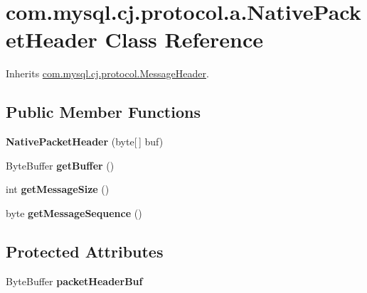 \hypertarget{classcom_1_1mysql_1_1cj_1_1protocol_1_1a_1_1_native_packet_header}{}\section{com.\+mysql.\+cj.\+protocol.\+a.\+Native\+Packet\+Header Class Reference}
\label{classcom_1_1mysql_1_1cj_1_1protocol_1_1a_1_1_native_packet_header}


Inherits \mbox{\hyperlink{interfacecom_1_1mysql_1_1cj_1_1protocol_1_1_message_header}{com.\+mysql.\+cj.\+protocol.\+Message\+Header}}.

\subsection*{Public Member Functions}
\begin{DoxyCompactItemize}
\item 
\mbox{\label{classcom_1_1mysql_1_1cj_1_1protocol_1_1a_1_1_native_packet_header_a835faea36a24b4d257415f21bfac6e1c}} 
{\bfseries Native\+Packet\+Header} (byte\mbox{[}$\,$\mbox{]} buf)
\item 
\mbox{\label{classcom_1_1mysql_1_1cj_1_1protocol_1_1a_1_1_native_packet_header_a4a2e68d77caa301eab35d33743c8a9ae}} 
Byte\+Buffer {\bfseries get\+Buffer} ()
\item 
\mbox{\label{classcom_1_1mysql_1_1cj_1_1protocol_1_1a_1_1_native_packet_header_a334336fd736a087bae40bfbb288e27e4}} 
int {\bfseries get\+Message\+Size} ()
\item 
\mbox{\label{classcom_1_1mysql_1_1cj_1_1protocol_1_1a_1_1_native_packet_header_aa711f4d714447b1e2cd4901af7f4d824}} 
byte {\bfseries get\+Message\+Sequence} ()
\end{DoxyCompactItemize}
\subsection*{Protected Attributes}
\begin{DoxyCompactItemize}
\item 
\mbox{\label{classcom_1_1mysql_1_1cj_1_1protocol_1_1a_1_1_native_packet_header_acc38ab1e40bb3c988932ceb4165b114c}} 
Byte\+Buffer {\bfseries packet\+Header\+Buf}
\end{DoxyCompactItemize}


